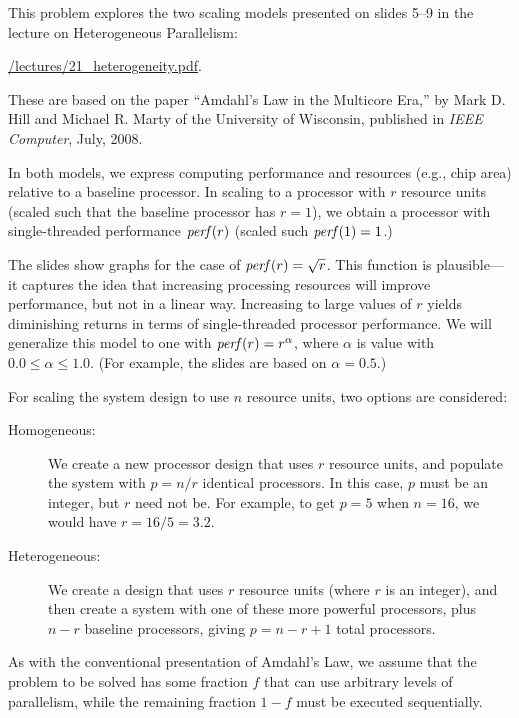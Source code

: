 \documentclass[11pt]{article}
\newcommand{\cref}[2]{\href{#1}{\color{blue}#2}}
\begin{document}
This problem explores the two scaling models presented on slides 5--9 in the lecture on Heterogeneous Parallelism:
\begin{center}
\cref{\actualcoursehome/lectures/19_heterogeneity.pdf}{\visiblecoursehome/lectures/21\_heterogeneity.pdf}.
\end{center}
These are based on the paper ``Amdahl's Law in the Multicore Era,'' by
Mark D. Hill and Michael R. Marty of the University of Wisconsin,
published in {\em IEEE Computer}, July, 2008.

In both models, we express computing performance and resources (e.g.,
chip area) relative to a baseline processor.  In scaling to a
processor with $r$ resource units (scaled such that the baseline
processor has $r=1$), we obtain a processor with single-threaded
performance ${\it perf}(r)$ (scaled such ${\it perf}(1) = 1$.)

The slides show graphs for the case of ${\it perf}(r) = \sqrt{r}$.
This function is plausible---it captures the idea that increasing
processing resources will improve performance, but not in a linear
way.  Increasing to large values of $r$ yields diminishing returns in
terms of single-threaded processor performance.  We will generalize
this model to one with ${\it perf}(r) = r^{\alpha}$, where $\alpha$ is
value with $0.0 \leq \alpha \leq 1.0$.  (For example, the slides are
based on $\alpha = 0.5$.)

For scaling the system design to use $n$ resource units, two
options are considered:
\begin{description}
\item[Homogeneous:] We create a new processor design that uses $r$
  resource units, and populate the system with $p = n/r$ identical
  processors.  In this case, $p$ must be an integer, but $r$ need not
  be.  For example, to get $p=5$ when $n=16$, we would have $r = 16/5 = 3.2$.

\item[Heterogeneous:] We create a design that uses $r$ resource units (where $r$ is an integer),
  and then create a system with one of these more powerful processors,
  plus $n-r$ baseline processors, giving $p = n - r + 1$ total processors.
\end{description}

As with the conventional presentation of Amdahl's Law, we assume that
the problem to be solved has some fraction $f$ that can use arbitrary
levels of parallelism, while the remaining fraction $1-f$ must be
executed sequentially.
\end{document}

